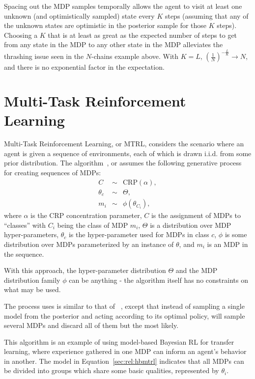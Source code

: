 Spacing out the MDP samples temporally allows the agent to visit at least one unknown (and optimistically sampled) state every $K$ steps (assuming that any of the unknown states are optimistic in the posterior sample for those $K$ steps). Choosing a $K$ that is at least as great as the expected number of steps to get from any state in the MDP to any other state in the MDP alleviates the thrashing issue seen in the $N$-chains example above. With $K=L$, $(\frac 1 N)^{-\frac L K} \rightarrow N$, and there is no exponential factor in the expectation.


\section{Multi-Task Reinforcement Learning}

Multi-Task Reinforcement Learning, or MTRL, considers the scenario where an agent is given a sequence of environments, each of which is drawn i.i.d. from some prior distribution. The  algorithm~\cite{wilson07}, or  assumes the following generative process for creating sequences of MDPs:
\begin{eqnarray}
\label{sec:rel:hbmtrl}
C &\sim& \mbox{CRP}(\alpha),\\
\theta_c &\sim& \Theta,\\
m_i &\sim& \phi(\theta_{C_i}),
\end{eqnarray}
where $\alpha$ is the CRP concentration parameter, $C$ is the assignment of MDPs to ``classes'' with $C_i$ being the class of MDP $m_i$, $\Theta$ is a distribution over MDP hyper-parameters, $\theta_c$ is the hyper-parameter used for MDPs in class $c$, $\phi$ is some distribution over MDPs parameterized by an instance of $\theta$, and $m_i$ is an MDP in the sequence.

With this approach, the hyper-parameter distribution $\Theta$ and the MDP distribution family $\phi$ can be anything - the algorithm itself has no constraints on what may be used.

The process  uses is similar to that of ~\cite{strens00}, except that instead of sampling a single model from the posterior and acting according to its optimal policy,  will sample several MDPs and discard all of them but the most likely.

This algorithm is an example of using model-based Bayesian RL for transfer learning, where experience gathered in one MDP can inform an agent's behavior in another. The model in Equation~\ref{sec:rel:hbmtrl} indicates that all MDPs can be divided into groups which share some basic qualities, represented by $\theta_i$.


